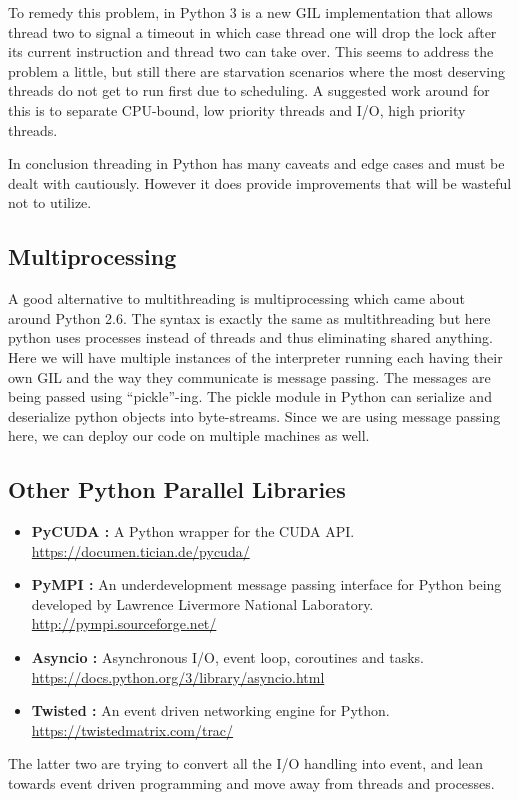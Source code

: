 \documentclass[10pt,twocolumn,letterpaper]{article}
\begin{document}
To remedy this problem, in Python 3 is a new GIL implementation that
allows thread two to signal a timeout in which case thread one will
drop the lock after its current instruction and thread two can take
over. This seems to address the problem a little, but still there
are starvation scenarios where the most deserving threads do not get
to run first due to scheduling. A suggested work around for this is
to separate CPU-bound, low priority threads and I/O, high priority
threads. 

In conclusion threading in Python has many caveats and edge cases
and must be dealt with cautiously. However it does provide improvements
that will be wasteful not to utilize.


\subsection{Multiprocessing}

A good alternative to multithreading is multiprocessing which came
about around Python 2.6. The syntax is exactly the same as multithreading
but here python uses processes instead of threads and thus eliminating
shared anything. Here we will have multiple instances of the interpreter
running each having their own GIL and the way they communicate is
message passing. The messages are being passed using ``pickle''-ing.
The pickle module in Python can serialize and deserialize python objects
into byte-streams. Since we are using message passing here, we can
deploy our code on multiple machines as well. 

\subsection{Other Python Parallel Libraries}
\begin{itemize}
\item \textbf{PyCUDA : }A Python wrapper for the CUDA API. \url{https://documen.tician.de/pycuda/}
\item \textbf{PyMPI : }An underdevelopment message passing interface for
Python being developed by Lawrence Livermore National Laboratory.
\url{http://pympi.sourceforge.net/}
\item \textbf{Asyncio : }Asynchronous I/O, event loop, coroutines and tasks.
\url{https://docs.python.org/3/library/asyncio.html}
\item \textbf{Twisted : }An event driven networking engine for Python. \url{https://twistedmatrix.com/trac/}
\end{itemize}
The latter two are trying to convert all the I/O handling into event,
and lean towards event driven programming and move away from threads
and processes.
\end{document}
